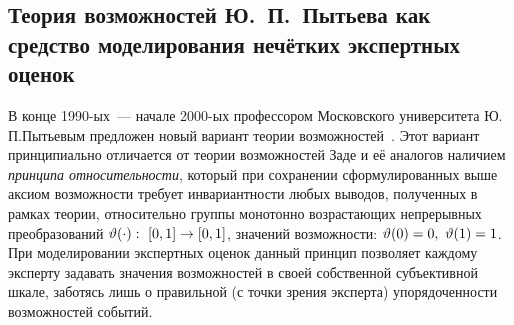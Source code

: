 \subsection{Теория возможностей Ю.~П.~Пытьева как средство моделирования нечётких экспертных оценок}
\label{sec:math_methods_ours}

В конце 1990-ых~--- начале 2000-ых профессором Московского университета Ю.\,П.\;Пытьевым предложен новый вариант теории возможностей~\cite{possbook, cit:smf, possbook2, probbook, pytyev_experts}. Этот вариант принципиально отличается от теории возможностей Заде и её аналогов наличием \emph{принципа относительности}, который при сохранении сформулированных выше аксиом возможности требует инвариантности любых выводов, полученных в рамках теории, относительно группы монотонно возрастающих непрерывных преобразований $\vartheta(\cdot):\ [0,1]\to[0,1]$, значений возможности: $\vartheta(0) = 0,\ \vartheta(1) = 1$. При моделировании экспертных оценок данный принцип позволяет каждому эксперту задавать значения возможностей в своей собственной субъективной шкале, заботясь лишь о правильной (с точки зрения эксперта) упорядоченности возможностей событий.

